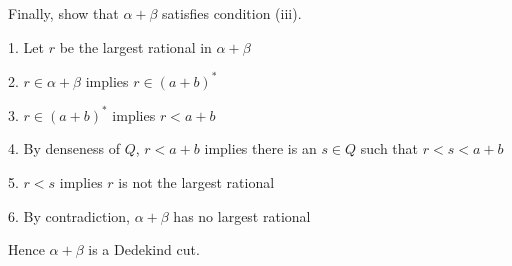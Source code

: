 \medskip
\noindent
Finally, show that $\alpha+\beta$ satisfies condition (iii).

\medskip
\item{1.} Let $r$ be the largest rational in $\alpha+\beta$
\item{2.} $r\in\alpha+\beta$ implies $r\in(a+b)^*$
\item{3.} $r\in(a+b)^*$ implies $r<a+b$
\item{4.} By denseness of $Q$, $r<a+b$ implies there is an $s\in Q$ such that $r<s<a+b$
\item{5.} $r<s$ implies $r$ is not the largest rational
\item{6.} By contradiction, $\alpha+\beta$ has no largest rational

\medskip
\noindent
Hence $\alpha+\beta$ is a Dedekind cut.
